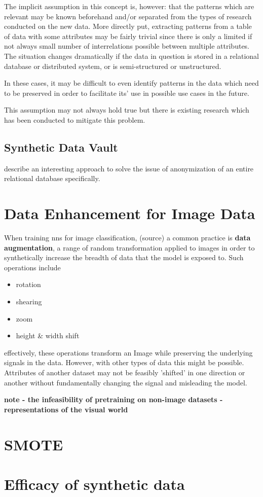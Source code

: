 The implicit assumption in this concept is, however: that the patterns which are relevant may be known beforehand and/or separated from the types of research conducted on the new data. More directly put, extracting patterns from a table of data with some attributes may be fairly trivial since there is only a limited if not always small number of interrelations possible between multiple attributes. 
The situation changes dramatically if the data in question is stored in a relational database or distributed system, or is semi-structured or unstructured.

In these cases, it may be difficult to even identify patterns in the data which need to be preserved in order to facilitate its' use in possible use cases in the future.

This assumption may not always hold true but there is existing research which has been conducted to mitigate this problem.

\pagebreak

\subsection{Synthetic Data Vault}

\cite{patki2016synthetic} describe an interesting approach to solve the issue of anonymization of an entire relational database specifically. 

\section{Data Enhancement for Image Data}

When training \acp{nn} for image classification, (source) a common practice is \textbf{data augmentation}, a range of random transformation applied to images in order to synthetically increase the breadth of data that the model is exposed to. 
Such operations include 
\begin{itemize}
	\item rotation
	\item shearing
	\item zoom
	\item height \& width shift
\end{itemize}

effectively, these operations transform an Image while preserving the underlying signals in the data. However, with other types of data this might be possible. Attributes of another dataset may not be feasibly 'shifted' in one direction or another without fundamentally changing the signal and misleading the model.

\textbf{note - the infeasibility of pretraining on non-image datasets - representations of the visual world}

\section{SMOTE}

\section{Efficacy of synthetic data}